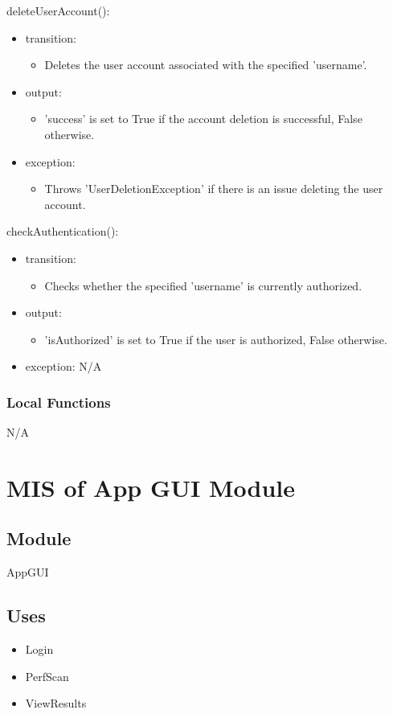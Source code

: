 \documentclass[12pt, titlepage]{article}
\begin{document}
\noindent deleteUserAccount():
\begin{itemize}
\item transition: \begin{itemize}
    \item Deletes the user account associated with the specified 'username'.
\end{itemize}
\item output: \begin{itemize}
    \item 'success' is set to True if the account deletion is successful, False otherwise.
\end{itemize} 
\item exception: \begin{itemize}
    \item Throws 'UserDeletionException' if there is an issue deleting the user account.
\end{itemize}
\end{itemize}

\noindent checkAuthentication():
\begin{itemize}
\item transition: \begin{itemize}
    \item Checks whether the specified 'username' is currently authorized.
\end{itemize} 
\item output: \begin{itemize}
    \item 'isAuthorized' is set to True if the user is authorized, False otherwise.
\end{itemize}
\item exception: N/A
\end{itemize}

\subsubsection{Local Functions}
N/A

\newpage

\section{MIS of App GUI Module} \label{Module} 
\subsection{Module}
AppGUI
\subsection{Uses}
\begin{itemize}
    \item Login
    \item PerfScan
    \item ViewResults
\end{itemize}
\end{document}
